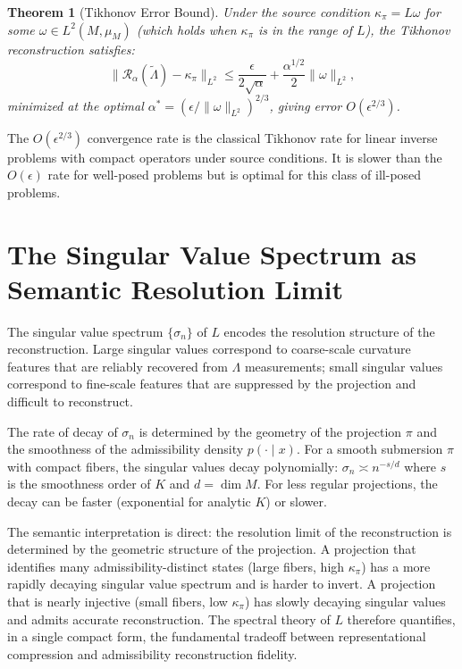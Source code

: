 \documentclass[12pt, oneside]{book}
\theoremstyle{plain-flyxion}
\newtheorem{theorem}{Theorem}[chapter]
\theoremstyle{definition-flyxion}
\newcommand{\kpi}{\kappa_{\pi}}
\newcommand{\Lam}{\Lambda}
\begin{document}
\begin{theorem}[Tikhonov Error Bound]\label{thm:tikhonov-error}
Under the source condition $\kpi = L\omega$ for some $\omega \in L^2(M,\mu_M)$
(which holds when $\kpi$ is in the range of $L$), the Tikhonov reconstruction satisfies:
\begin{equation}\label{eq:tikhonov-error}
\|\mathcal{R}_\alpha(\tilde\Lam) - \kpi\|_{L^2}
\leq \frac{\epsilon}{2\sqrt{\alpha}} + \frac{\alpha^{1/2}}{2}\|\omega\|_{L^2},
\end{equation}
minimized at the optimal $\alpha^* = (\epsilon/\|\omega\|_{L^2})^{2/3}$, giving error
$O(\epsilon^{2/3})$.
\end{theorem}

The $O(\epsilon^{2/3})$ convergence rate is the classical Tikhonov rate for linear
inverse problems with compact operators under source conditions. It is slower than the
$O(\epsilon)$ rate for well-posed problems but is optimal for this class of ill-posed
problems.

\section{The Singular Value Spectrum as Semantic Resolution Limit}

The singular value spectrum $\{\sigma_n\}$ of $L$ encodes the resolution structure of
the reconstruction. Large singular values correspond to coarse-scale curvature features
that are reliably recovered from $\Lam$ measurements; small singular values correspond
to fine-scale features that are suppressed by the projection and difficult to reconstruct.

The rate of decay of $\sigma_n$ is determined by the geometry of the projection $\pi$
and the smoothness of the admissibility density $p(\cdot\mid x)$. For a smooth submersion
$\pi$ with compact fibers, the singular values decay polynomially: $\sigma_n \asymp
n^{-s/d}$ where $s$ is the smoothness order of $K$ and $d = \dim M$. For less regular
projections, the decay can be faster (exponential for analytic $K$) or slower.

The semantic interpretation is direct: the resolution limit of the reconstruction is
determined by the geometric structure of the projection. A projection that identifies
many admissibility-distinct states (large fibers, high $\kpi$) has a more rapidly
decaying singular value spectrum and is harder to invert. A projection that is nearly
injective (small fibers, low $\kpi$) has slowly decaying singular values and admits
accurate reconstruction. The spectral theory of $L$ therefore quantifies, in a single
compact form, the fundamental tradeoff between representational compression and
admissibility reconstruction fidelity.
\end{document}
